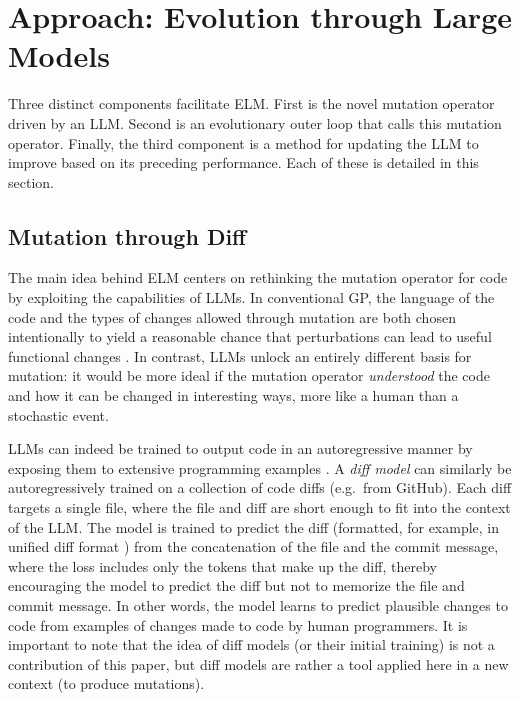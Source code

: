 \documentclass{article}
\begin{document}
\section{Approach: Evolution through Large Models}





Three distinct components facilitate ELM.  First is the novel mutation operator driven by an LLM.  Second is an evolutionary outer loop that calls this mutation operator. Finally, the third component is a method for updating the LLM to improve based on its preceding performance.  Each of these is detailed in this section. 

\subsection{Mutation through Diff}

The main idea behind ELM centers on rethinking the mutation operator for code by exploiting the capabilities of LLMs.  In conventional GP, the language of the code and the types of changes allowed through mutation are both chosen intentionally to yield a reasonable chance that perturbations can lead to useful functional changes \cite{koza:book92}.  In contrast, LLMs unlock an entirely different basis for mutation: it would be more ideal if the mutation operator \emph{understood} the code and how it can be changed in interesting ways, more like a human than a stochastic event.  

LLMs can indeed be trained to output code in an autoregressive manner by exposing them to extensive programming examples \cite{chen:codex,li2022competition}.  
A \emph{diff model} \cite{diff_train} can similarly be autoregressively trained on a collection of code diffs (e.g.\ from GitHub).
Each diff targets a single file, where the 
file and diff are short enough to fit into the context of the LLM. 
The model is trained to predict the diff (formatted, for example, in unified diff format \cite{unified_diff}) from the concatenation of the file and the commit message, where the loss includes only the tokens that make up the diff, thereby encouraging the model to predict the diff but not to memorize the file and commit message. In other words, the model learns to predict plausible changes to code from examples of changes made to code by human programmers.
It is important to note that the idea of diff models (or their initial training) \cite{diff_train} is not a contribution of this paper, but diff models are rather a tool applied here in a new context (to produce mutations).
\end{document}
